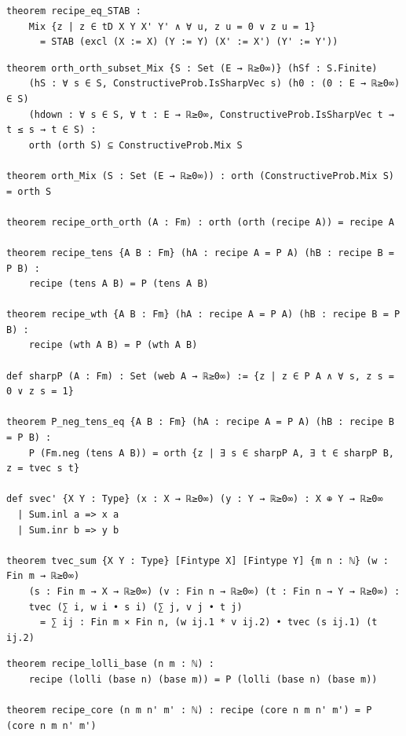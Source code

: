 \begin{lstlisting}
theorem recipe_eq_STAB :
    Mix {z | z ∈ tD X Y X' Y' ∧ ∀ u, z u = 0 ∨ z u = 1}
      = STAB (excl (X := X) (Y := Y) (X' := X') (Y' := Y'))
\end{lstlisting}

\begin{lstlisting}
theorem orth_orth_subset_Mix {S : Set (E → ℝ≥0∞)} (hSf : S.Finite)
    (hS : ∀ s ∈ S, ConstructiveProb.IsSharpVec s) (h0 : (0 : E → ℝ≥0∞) ∈ S)
    (hdown : ∀ s ∈ S, ∀ t : E → ℝ≥0∞, ConstructiveProb.IsSharpVec t → t ≤ s → t ∈ S) :
    orth (orth S) ⊆ ConstructiveProb.Mix S

theorem orth_Mix (S : Set (E → ℝ≥0∞)) : orth (ConstructiveProb.Mix S) = orth S

theorem recipe_orth_orth (A : Fm) : orth (orth (recipe A)) = recipe A

theorem recipe_tens {A B : Fm} (hA : recipe A = P A) (hB : recipe B = P B) :
    recipe (tens A B) = P (tens A B)

theorem recipe_wth {A B : Fm} (hA : recipe A = P A) (hB : recipe B = P B) :
    recipe (wth A B) = P (wth A B)

def sharpP (A : Fm) : Set (web A → ℝ≥0∞) := {z | z ∈ P A ∧ ∀ s, z s = 0 ∨ z s = 1}

theorem P_neg_tens_eq {A B : Fm} (hA : recipe A = P A) (hB : recipe B = P B) :
    P (Fm.neg (tens A B)) = orth {z | ∃ s ∈ sharpP A, ∃ t ∈ sharpP B, z = tvec s t}

def svec' {X Y : Type} (x : X → ℝ≥0∞) (y : Y → ℝ≥0∞) : X ⊕ Y → ℝ≥0∞
  | Sum.inl a => x a
  | Sum.inr b => y b

theorem tvec_sum {X Y : Type} [Fintype X] [Fintype Y] {m n : ℕ} (w : Fin m → ℝ≥0∞)
    (s : Fin m → X → ℝ≥0∞) (v : Fin n → ℝ≥0∞) (t : Fin n → Y → ℝ≥0∞) :
    tvec (∑ i, w i • s i) (∑ j, v j • t j)
      = ∑ ij : Fin m × Fin n, (w ij.1 * v ij.2) • tvec (s ij.1) (t ij.2)
\end{lstlisting}

\begin{lstlisting}
theorem recipe_lolli_base (n m : ℕ) :
    recipe (lolli (base n) (base m)) = P (lolli (base n) (base m))

theorem recipe_core (n m n' m' : ℕ) : recipe (core n m n' m') = P (core n m n' m')
\end{lstlisting}

